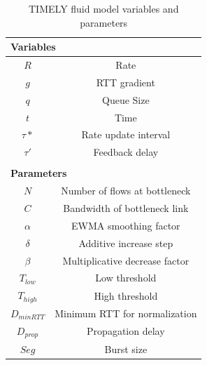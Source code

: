 \begin{table}[t]
\center
{
\footnotesize
{
\begin{tabular}{|c|c|}
\multicolumn{2}{l}{\bf Variables} \\ \hline
$R$ & Rate \\ \hline
$g$ & RTT gradient\\ \hline
$q$ & Queue Size \\ \hline
$t$ & Time \\ \hline
$\tau*$ & Rate update interval \\ \hline
$\tau'$ & Feedback delay \\ \hline
\multicolumn{2}{c}{} \vspace{-1em} \\
\multicolumn{2}{l}{\bf Parameters} \\ \hline
$N$ & Number of flows at bottleneck\\ \hline
$C$ & Bandwidth of bottleneck link\\ \hline
$\alpha$ & EWMA smoothing factor\\ \hline
$\delta$ & Additive increase step\\ \hline
$\beta$ & Multiplicative decrease factor\\ \hline
$T_{low}$ & Low threshold\\ \hline
$T_{high}$ & High threshold\\ \hline
$D_{minRTT}$ & Minimum RTT for normalization \\ \hline
$D_{prop}$ & Propagation delay \\ \hline
$Seg$ & Burst size \\ \hline
\end{tabular}
}
}
\vspace{-0.7em}
\caption{TIMELY fluid model variables and parameters}
\label{tab:timely_varparam}
\end{table}

